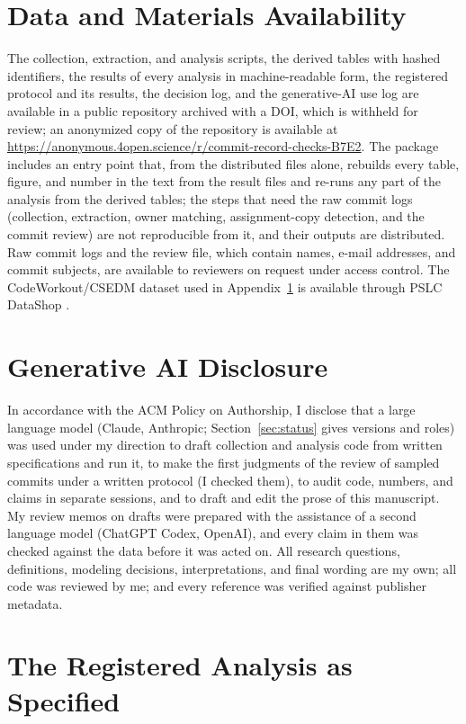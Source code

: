 \documentclass[acmsmall,screen,review,anonymous]{acmart}
\begin{document}
\section*{Data and Materials Availability}
The collection, extraction, and analysis scripts, the derived tables with hashed identifiers, the results of every analysis in machine-readable form, the registered protocol and its results, the decision log, and the generative-AI use log are available in a public repository archived with a DOI, which is withheld for review; an anonymized copy of the repository is available at \url{https://anonymous.4open.science/r/commit-record-checks-B7E2}. The package includes an entry point that, from the distributed files alone, rebuilds every table, figure, and number in the text from the result files and re-runs any part of the analysis from the derived tables; the steps that need the raw commit logs (collection, extraction, owner matching, assignment-copy detection, and the commit review) are not reproducible from it, and their outputs are distributed. Raw commit logs and the review file, which contain names, e-mail addresses, and commit subjects, are available to reviewers on request under access control. The CodeWorkout/CSEDM dataset used in Appendix~\ref{app:registered} is available through PSLC DataShop \citep{codeworkout2020dataset}.

\section*{Generative AI Disclosure}
In accordance with the ACM Policy on Authorship, I disclose that a large language model (Claude, Anthropic; Section~\ref{sec:status} gives versions and roles) was used under my direction to draft collection and analysis code from written specifications and run it, to make the first judgments of the review of sampled commits under a written protocol (I checked them), to audit code, numbers, and claims in separate sessions, and to draft and edit the prose of this manuscript. My review memos on drafts were prepared with the assistance of a second language model (ChatGPT Codex, OpenAI), and every claim in them was checked against the data before it was acted on. All research questions, definitions, modeling decisions, interpretations, and final wording are my own; all code was reviewed by me; and every reference was verified against publisher metadata.

\appendix


\section{The Registered Analysis as Specified}
\label{app:registered}
\end{document}
